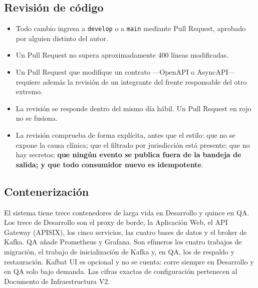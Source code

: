 \documentclass[11pt,a4paper]{article}
\begin{document}
\subsection{Revisión de código}
\label{sec:revision}

\begin{itemize}
\item Todo cambio ingresa a \texttt{develop} o a \texttt{main} mediante Pull Request, aprobado por alguien distinto del autor.
\item Un Pull Request no supera aproximadamente 400 líneas modificadas.
\item Un Pull Request que modifique un contrato ---OpenAPI o AsyncAPI--- requiere además la revisión de un integrante del frente responsable del otro extremo.
\item La revisión se responde dentro del mismo día hábil. Un Pull Request en rojo no se fusiona.
\item La revisión comprueba de forma explícita, antes que el estilo: que no se expone la causa clínica; que el filtrado por jurisdicción está presente; que no hay secretos; \textbf{que ningún evento se publica fuera de la bandeja de salida; y que todo consumidor nuevo es idempotente}.
\end{itemize}

\subsection{Contenerización}
\label{sec:contenedores}

El sistema tiene trece contenedores de larga vida en Desarrollo y quince en QA. Los trece de Desarrollo son el proxy de borde, la Aplicación Web, el API Gateway (APISIX), los cinco servicios, las cuatro bases de datos y el broker de Kafka. QA añade Prometheus y Grafana. Son efímeros los cuatro trabajos de migración, el trabajo de inicialización de Kafka y, en QA, los de respaldo y restauración. Kafbat UI es opcional y no se cuenta: corre siempre en Desarrollo y en QA solo bajo demanda. Las cifras exactas de configuración pertenecen al Documento de Infraestructura V2.
\end{document}

